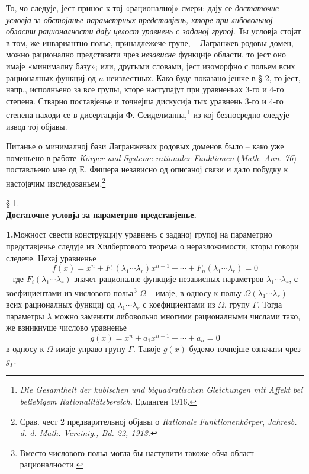 ﻿\documentclass[11pt]{article}
\begin{document}
То, чо следује, јест принос к тој «рационалној» смери: дају се {\itshape достаточне условја} за {\itshape обстојанье параметрных представјень, кторе при либовольној области рационалности дају целост уравнень с заданој групој}. Ты условја стојат в том, же инвариантно полье, принадлежече групе, -- Лагранжев родовы домен, -- можно рационално представити чрез {\itshape независне} функције области, то јест оно имаје «минималну базу»; или, другыми словами, јест изоморфно с польем всих рационалных функциј од $n$ неизвестных. Како буде показано јешче в § 2, то јест, напр., исполньено за все групы, кторе наступајут при уравненьах 3-го и 4-го степена. Стварно поставјенье и точнејша дискусија тых уравнень 3-го и 4-го степена находи се в дисертацији Ф. Сеиделманна,\footnote{\emph{Die Gesamtheit der kubischen und biquadratischen Gleichungen mit Affekt bei beliebigem Rationalitätsbereich}. Ерланген 1916.} из кој безпосредно следује извод тој објавы.

Питанье о минималној бази Лагранжевых родовых доменов было -- како уже поменьено в работе \emph{Körper und Systeme rationaler Funktionen} (\emph{Math. Ann. 76}) -- поставльено мне од Е. Фишера независно од описаној связи и дало побудку к настојачим изследованьем.\footnote{Срав. чест 2 предварительној објавы о \emph{Rationale Funktionenkörper}, \emph{Jahresb. d. d. Math. Vereinig., Bd. 22, 1913}.}

\begin{center}
§ 1.\\[0.75\baselineskip]
\textbf{Достаточне условја за параметрно представјенье.}
\end{center}

\noindent\textbf{1.}\quad Можност свести конструкцију уравнень с заданој групој на параметрно представјенье следује из Хилбертового теорема о неразложимости, кторы говори следече. Нехај уравненье
\begin{equation}
 f(x)=x^n+F_1(\lambda_1\cdots\lambda_r)x^{n-1}+\cdots+F_n(\lambda_1\cdots\lambda_r)=0
\tag{1}
\end{equation}
-- где $F_i(\lambda_1\cdots\lambda_r)$ значет рационалне функције независных параметров $\lambda_1\cdots\lambda_r$, с коефициентами из числового польа\footnote{Вместо числового польа могла бы наступити такоже обча област рационалности.} $\Omega$ -- имаје, в односу к польу $\Omega(\lambda_1\cdots\lambda_r)$ всих рационалных функциј од $\lambda_1\cdots\lambda_r$ с коефициентами из $\Omega$, групу $\Gamma$. Тогда параметры $\lambda$ можно заменити либовольно многими рационалными числами тако, же взникнуше числово уравненье
\begin{equation}
 g(x)=x^n+a_1x^{n-1}+\cdots+a_n=0
\tag{2}
\end{equation}
в односу к $\Omega$ имаје управо групу $\Gamma$. Такоје $g(x)$ будемо точнејше означати чрез $g_\Gamma$.
\end{document}
